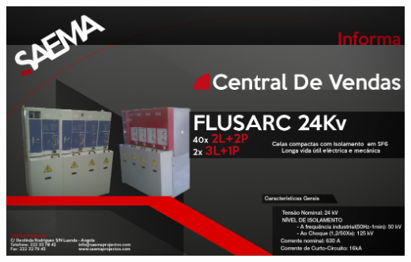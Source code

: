 \begin{multicols}{2}

\end{multicols}
\vspace{0.5cm}
\centering\includegraphics[scale=0.3]{aihbbgje.jpg}

\newpage


